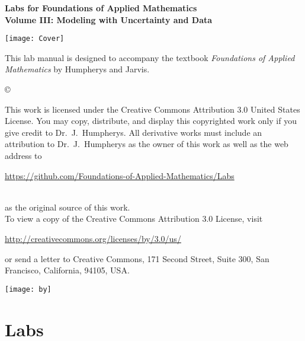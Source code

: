 \documentclass[nociteref]{SIAM-GH-book}
\begin{document}

\thispagestyle{empty} %

\begin{center}
{\huge \bf Labs for Foundations of Applied Mathematics} \\
\vspace{5mm}
{\Large \bf Volume III: Modeling with Uncertainty and Data}
\vspace{20mm}

\texttt{[image: Cover]}
\end{center}
\frontmatter



\begin{thepreface} %

This lab manual is designed to accompany the textbook \emph{Foundations of Applied Mathematics} by Humpherys and Jarvis.

\vfill
\copyright{This work is licensed under the Creative Commons Attribution 3.0 United States
License.  You may copy, distribute, and display this copyrighted work only if you give
credit to Dr.~J.~Humpherys. All derivative works must include an attribution to Dr.~J.~Humpherys as the owner of this work as well as the web address to
\\\centerline{\url{https://github.com/Foundations-of-Applied-Mathematics/Labs}}\\as the original source of this work.
\\To view a copy of the Creative Commons Attribution 3.0 License, visit
\\\centerline{\url{http://creativecommons.org/licenses/by/3.0/us/}} or send a letter to Creative Commons, 171 Second Street, Suite 300, San Francisco, California, 94105, USA.}

\vfill
\centering\texttt{[image: by]}
\vfill
\end{thepreface}

\setcounter{tocdepth}{1}
\tableofcontents

\mainmatter %


\part{Labs}
\end{document}
